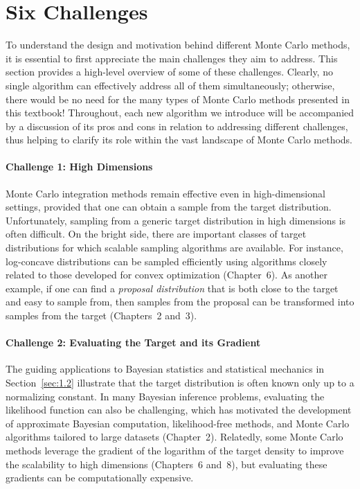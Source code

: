 \section{Six Challenges}
\label{sec:1.3}

To understand the design and motivation behind different Monte Carlo methods, it is essential
to first appreciate the main challenges they aim to address. This section provides a high-level
overview of some of these challenges. Clearly, no single algorithm can effectively address all
of them simultaneously; otherwise, there would be no need for the many types of Monte Carlo
methods presented in this textbook! Throughout, each new algorithm we introduce will be accompanied
by a discussion of its pros and cons in relation to addressing different challenges, thus helping
to clarify its role within the vast landscape of Monte Carlo methods.

\paragraph{Challenge 1: High Dimensions}
Monte Carlo integration methods remain effective even in high-dimensional settings, provided that
one can obtain a sample from the target distribution. Unfortunately, sampling from a generic target
distribution in high dimensions is often difficult. On the bright side, there are important classes
of target distributions for which scalable sampling algorithms are available. For instance,
log-concave distributions can be sampled efficiently using algorithms closely related to those
developed for convex optimization (Chapter~6). As another example, if one can find a
\textit{proposal distribution} that is both close to the target and easy to sample from, then
samples from the proposal can be transformed into samples from the target (Chapters~2 and~3).

\paragraph{Challenge 2: Evaluating the Target and its Gradient}
The guiding applications to Bayesian statistics and statistical mechanics in Section~\ref{sec:1.2}
illustrate that the target distribution is often known only up to a normalizing constant. In many
Bayesian inference problems, evaluating the likelihood function can also be challenging, which has
motivated the development of approximate Bayesian computation, likelihood-free methods, and Monte
Carlo algorithms tailored to large datasets (Chapter~2). Relatedly, some Monte Carlo methods
leverage the gradient of the logarithm of the target density to improve the scalability to high
dimensions (Chapters~6 and~8), but evaluating these gradients can be computationally expensive.

